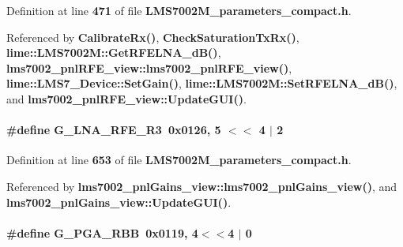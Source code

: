Definition at line {\bf 471} of file {\bf L\+M\+S7002\+M\+\_\+parameters\+\_\+compact.\+h}.



Referenced by {\bf Calibrate\+Rx()}, {\bf Check\+Saturation\+Tx\+Rx()}, {\bf lime\+::\+L\+M\+S7002\+M\+::\+Get\+R\+F\+E\+L\+N\+A\+\_\+d\+B()}, {\bf lms7002\+\_\+pnl\+R\+F\+E\+\_\+view\+::lms7002\+\_\+pnl\+R\+F\+E\+\_\+view()}, {\bf lime\+::\+L\+M\+S7\+\_\+\+Device\+::\+Set\+Gain()}, {\bf lime\+::\+L\+M\+S7002\+M\+::\+Set\+R\+F\+E\+L\+N\+A\+\_\+d\+B()}, and {\bf lms7002\+\_\+pnl\+R\+F\+E\+\_\+view\+::\+Update\+G\+U\+I()}.

\paragraph[{G\+\_\+\+L\+N\+A\+\_\+\+R\+F\+E\+\_\+\+R3}]{\setlength{\rightskip}{0pt plus 5cm}\#define G\+\_\+\+L\+N\+A\+\_\+\+R\+F\+E\+\_\+\+R3~0x0126, 5 $<$$<$ 4 $\vert$ 2}\label{LMS7002M__parameters__compact_8h_ae855d559643308686269959506ff7d54}


Definition at line {\bf 653} of file {\bf L\+M\+S7002\+M\+\_\+parameters\+\_\+compact.\+h}.



Referenced by {\bf lms7002\+\_\+pnl\+Gains\+\_\+view\+::lms7002\+\_\+pnl\+Gains\+\_\+view()}, and {\bf lms7002\+\_\+pnl\+Gains\+\_\+view\+::\+Update\+G\+U\+I()}.

\paragraph[{G\+\_\+\+P\+G\+A\+\_\+\+R\+BB}]{\setlength{\rightskip}{0pt plus 5cm}\#define G\+\_\+\+P\+G\+A\+\_\+\+R\+BB~0x0119, 4$<$$<$4 $\vert$  0}\label{LMS7002M__parameters__compact_8h_a604f79c9beca7a8049482de79aee0942}


